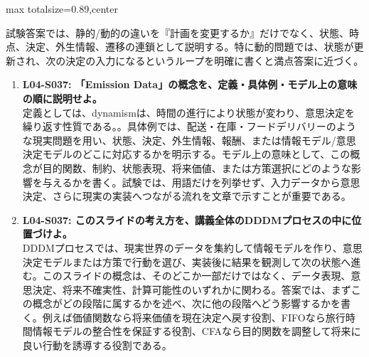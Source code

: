 \begin{minipage}[t]{0.58\textwidth}
\begin{adjustbox}{max totalsize={\textwidth}{0.89\textheight},center}
\begin{minipage}{\textwidth}
試験答案では、静的/動的の違いを『計画を変更するか』だけでなく、状態、時点、決定、外生情報、遷移の連鎖として説明する。特に動的問題では、状態が更新され、次の決定の入力になるというループを明確に書くと満点答案に近づく。\par{}\begin{enumerate}\item \textbf{L04-S037: 「Emission Data」の概念を、定義・具体例・モデル上の意味の順に説明せよ。}\\定義としては、dynamismは、時間の進行により状態が変わり、意思決定を繰り返す性質である。。具体例では、配送・在庫・フードデリバリーのような現実問題を用い、状態、決定、外生情報、報酬、または情報モデル/意思決定モデルのどこに対応するかを明示する。モデル上の意味として、この概念が目的関数、制約、状態表現、将来価値、または方策選択にどのような影響を与えるかを書く。試験では、用語だけを列挙せず、入力データから意思決定、さらに現実の実装へつながる流れを文章で示すことが重要である。\item \textbf{L04-S037: このスライドの考え方を、講義全体のDDDMプロセスの中に位置づけよ。}\\DDDMプロセスでは、現実世界のデータを集約して情報モデルを作り、意思決定モデルまたは方策で行動を選び、実装後に結果を観測して次の状態へ進む。このスライドの概念は、そのどこか一部だけではなく、データ表現、意思決定、将来不確実性、計算可能性のいずれかに関わる。答案では、まずこの概念がどの段階に属するかを述べ、次に他の段階へどう影響するかを書く。例えば価値関数なら将来価値を現在決定へ戻す役割、FIFOなら旅行時間情報モデルの整合性を保証する役割、CFAなら目的関数を調整して将来に良い行動を誘導する役割である。\end{enumerate}
\end{minipage}
\end{adjustbox}
\end{minipage}


